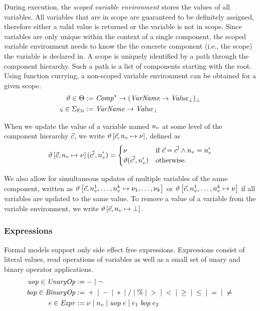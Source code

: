 \documentclass[a4paper,10pt,english]{article}
\begin{document}
During execution, the \textit{scoped variable environment} stores the values of all variables. All variables that are in scope are
guaranteed to be definitely assigned, therefore either a valid value is returned or the variable is not in scope. Since variables
are only unique within the context of a single component, the scoped variable environment needs to know the the concrete component
(i.e., the scope) the variable is declared in. A scope is uniquely identified by a path through the component
hierarchy. Such a path is a list of components starting with the root. Using function currying, a non-scoped variable environment
can be obtained for a given scope.
\begin{align*}
	\vartheta \in \Theta &:= \mathit{Comp}^* \rightarrow (\mathit{VarName} \rightarrow \mathit{Value}_\bot)_\bot \\
	\varsigma \in \Sigma_\textsc{Fm} &:= \mathit{VarName} \rightarrow \mathit{Value}_\bot
\end{align*}

When we update the value of a variable named $n_v$ at some level of the component hierarchy $\vec{c}$, we write
$\vartheta\left[\vec{c}, n_v \mapsto \nu \right]$, defined as
\begin{equation*}
	\vartheta\left[\vec{c}, n_v \mapsto \nu \right](\vec{c'}, n_v') =
		\begin{cases}
			\nu & \text{if } \vec{c} = \vec{c'} \wedge n_v = n_v' \\
			\vartheta(\vec{c'}, n_v') & \text{otherwise.}
		\end{cases}
\end{equation*}

We also allow for simultaneous updates of multiple variables of the same component, written as $\vartheta\left[\vec{c},
n_v^1, \ldots, n_v^k \mapsto \nu_1, \ldots, \nu_k \right]$ or $\vartheta\left[\vec{c},
n_v^1, \ldots, n_v^k \mapsto \nu \right]$ if all variables are updated to the same value. To remove a value of a
variable from the variable environment, we write $\vartheta\left[\vec{c}, n_v \mapsto \bot \right]$.

\subsubsection{Expressions}
Formal models support only side effect free expressions. Expressions consist of literal values, read operations of variables
as well as a small set of unary and binary operator applications.
\begin{align*}
	\mathit{uop} \in \mathit{UnaryOp} & := - \mid \neg
	\\
    \mathit{bop} \in \mathit{BinaryOp} & := {} + {} \mid {} - {} \mid {} \ast {} \mid {} / {}
                       \mid {} \% {} \mid {} > {} \mid {} < {} \mid {} \geq {} 
                       \mid {} \leq {} \mid {} = {} \mid {} \neq {}
	\\
	e \in \mathit{Expr} & := 
		\nu \mid
		n_v \mid 
		\mathit{uop}\; e \mid
		e_1 \;\mathit{bop}\; e_2
\end{align*}
\end{document}

